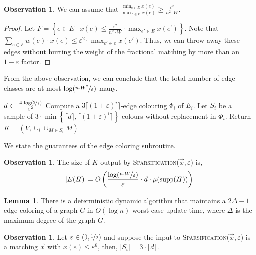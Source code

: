 \documentclass[a4paper,11pt]{article}
\newcommand{\card}[1]{|#1|}
\newcommand{\paren}[1]{\left ( #1 \right )}
\newcommand{\set}[1]{\ensuremath{\left\{ #1 \right\}}}
\newcommand{\eps}{\varepsilon}
\theoremstyle{definition}
\theoremstyle{definition}
\theoremstyle{definition}
\theoremstyle{definition}
\theoremstyle{definition}
\newtheorem{lemma2}[definition2]{Lemma}
\theoremstyle{definition}
\theoremstyle{definition}
\newtheorem{observation2}[definition2]{Observation}
\theoremstyle{definition}
\theoremstyle{definition}
\theoremstyle{definition}
\theoremstyle{definition}
\theoremstyle{definition}
\theoremstyle{definition}
\theoremstyle{definition}
\theoremstyle{definition}
\begin{document}
\begin{observation2}
    We can assume that $\frac{\min_{e\in E} x(e)}{\max_{e\in E}x(e)}\geqslant \frac{\eps^2}{n^2\cdot W}$. 
\end{observation2}
\begin{proof}
Let $F=\set{e\in E\mid x(e)\leqslant \frac{\eps^2}{n^2\cdot W}\cdot \max_{e'\in E}x(e')}$. Note that $\sum_{e\in F}w(e)\cdot x(e)\leqslant \eps^2\cdot \max_{e'\in e}x(e')$. Thus, we can throw away these edges without hurting the weight of the fractional matching by more than an $1-\eps$ factor.
\end{proof}
From the above observation, we can conclude that the total number of edge classes are at most $\log(\nicefrac{n\cdot W^2}{\eps})$ many.
\begin{algorithm}
	\caption{\textsc{Sparsification}($\vec{x},\eps$)}
	\begin{algorithmic}[1]
		\State $d\leftarrow \frac{4\cdot \log\paren{\nicefrac{2}{\eps}}}{\eps^2}$
		\For{$i\in \set{1,2,\cdots, 2\log_{1+\eps}(\nicefrac{n\cdot W}{\eps})}$}
		\State Compute a $3\lceil (1+\eps)^i\rceil$-edge colouring $\Phi_i$ of $E_i$.
		\State Let $S_i$ be a sample of $3\cdot \min\set{\lceil d\rceil,\lceil (1+\eps)^i\rceil}$ colours without replacement in $\Phi_i$. \label{line:blah}
		\State Return $K=(V,\cup_{i}\cup_{M\in S_i}M)$
		\EndFor
	\end{algorithmic}
\end{algorithm}

We state the guarantees of the edge coloring subroutine. 

\begin{observation2}
	The size of $K$ output by \textsc{Sparsification}($\vec{x},\eps$) is,
	\begin{align*}
	\card{E(H)}=O\paren{\frac{\log (\nicefrac{n\cdot W}{\eps})}{\eps}\cdot d\cdot \mu(\textup{supp}(H))}
	\end{align*}
\end{observation2}

\begin{lemma2}\label{lem:edgecolour}\cite{BDHN18}
There is a deterministic dynamic algorithm that maintains a $2\Delta-1$ edge coloring of a graph $G$ in $O(\log n)$ worst case update time, where $\Delta$ is the maximum degree of the graph $G$. 
\end{lemma2}

\begin{observation2}\label{obs:sampling}
Let $\eps\in (0,\nicefrac{1}{2})$ and suppose the input to \textsc{Sparsification}($\vec{x},\eps$) is a matching $\vec{x}$ with $x(e)\leqslant \eps^6$, then, $\card{S_i}=3\cdot \lceil d\rceil$. 
\end{observation2}
\end{document}
